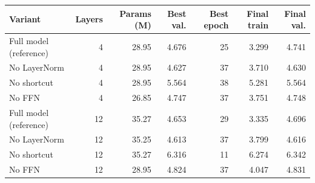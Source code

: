 \begin{tabular}{lrrrrrr}
\toprule
Variant & Layers & Params (M) & Best val. & Best epoch & Final train & Final val. \\
\midrule
Full model (reference) & 4 & 28.95 & 4.676 & 25 & 3.299 & 4.741 \\
No LayerNorm & 4 & 28.95 & 4.627 & 37 & 3.710 & 4.630 \\
No shortcut & 4 & 28.95 & 5.564 & 38 & 5.281 & 5.564 \\
No FFN & 4 & 26.85 & 4.747 & 37 & 3.751 & 4.748 \\
\midrule
Full model (reference) & 12 & 35.27 & 4.653 & 29 & 3.335 & 4.696 \\
No LayerNorm & 12 & 35.25 & 4.613 & 37 & 3.799 & 4.616 \\
No shortcut & 12 & 35.27 & 6.316 & 11 & 6.274 & 6.342 \\
No FFN & 12 & 28.95 & 4.824 & 37 & 4.047 & 4.831 \\
\bottomrule
\end{tabular}
